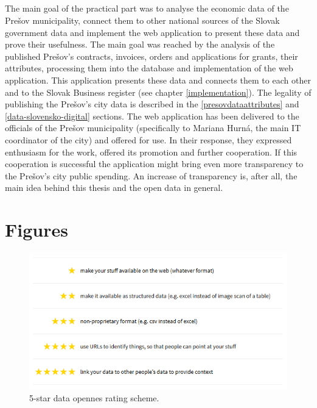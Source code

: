 \documentclass[thesis=B,english]{sprlajur-slovakopendata}[2018/05/12]
\begin{document}
{\begin{conclusion}
		\paragraph*{} The main goal of the practical part was to analyse the economic data of the Prešov municipality, connect them to other national sources of the Slovak government data and implement the web application to present these data and prove their usefulness. The main goal was reached by the analysis of the published Prešov's contracts, invoices, orders and applications for grants, their attributes, processing them into the database and implementation of the web application. This application presents these data and connects them to each other and to the Slovak Business register (see chapter \ref{implementation}). The legality of publishing the Prešov's city data is described in the \ref{presovdataattributes} and \ref{data-slovensko-digital} sections. The web application has been delivered to the officials of the Prešov municipality (specifically to Mariana Hurná, the main IT coordinator of the city) and offered for use. In their response, they expressed enthusiasm for the work, offered its promotion and further cooperation. If this cooperation is successful the application might bring even more transparency to the Prešov's city public spending. An increase of transparency is, after all, the main idea behind this thesis and the open data in general.
			
	\end{conclusion}
	
	\chapter*{Figures}
	\begin{figure}[H]
		\includegraphics[width=\linewidth]{pictures/5starRating.png}
		\caption{5-star data opennes rating scheme. \cite{5stardata}}
		\label{fig:5-star}
	\end{figure}
	
}
\end{document}
